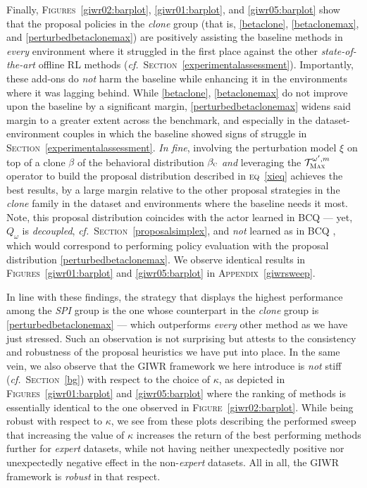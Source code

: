 Finally, \textsc{Figures}~\ref{giwr02:barplot}, \ref{giwr01:barplot}, and \ref{giwr05:barplot}
show that the proposal policies in the \textit{clone} group
(that is, \ref{betaclone}, \ref{betaclonemax}, and \ref{perturbedbetaclonemax})
are positively assisting the baseline methods in \emph{every} environment where it struggled in the first place
against the other \textit{state-of-the-art} offline RL methods
(\textit{cf.}~\textsc{Section}~\ref{experimentalassessment}).
Importantly, these add-ons do \emph{not} harm the baseline while enhancing it in the environments where
it was lagging behind.
While \ref{betaclone}, \ref{betaclonemax} do not improve upon the baseline by a significant margin,
\ref{perturbedbetaclonemax} widens said margin to a greater extent across the benchmark,
and especially in the dataset-environment couples in which the baseline showed signs of struggle in
\textsc{Section}~\ref{experimentalassessment}.
\textit{In fine}, involving the perturbation model $\xi$ on top of a clone $\beta$
of the behavioral distribution $\beta_\textsc{c}$
\emph{and} leveraging the $\mathcal{T}_\textsc{Max}^{\omega', m}$ operator
to build the proposal distribution described in \textsc{eq}~\ref{xieq}
achieves the best results, by a large margin relative
to the other proposal strategies in the \textit{clone} family in the dataset and environments where
the baseline needs it most.
Note, this proposal distribution coincides with the actor learned in BCQ \cite{Fujimoto2018-mj}
--- yet, $Q_\omega$ is \emph{decoupled}, \textit{cf.}~\textsc{Section}~\ref{proposalsimplex},
and \emph{not} learned as in BCQ \cite{Fujimoto2018-mj}, which would correspond to performing
policy evaluation with the proposal distribution \ref{perturbedbetaclonemax}.
We observe identical results in \textsc{Figures}~\ref{giwr01:barplot} and \ref{giwr05:barplot}
in \textsc{Appendix}~\ref{giwrsweep}.

In line with these findings, the strategy that displays the highest performance among the \textit{SPI} group
is the one whose counterpart in the \textit{clone} group is \ref{perturbedbetaclonemax}
--- which outperforms \emph{every} other method as we have just stressed.
Such an observation is not surprising but attests to the consistency and robustness of the proposal
heuristics we have put into place.
In the same vein, we also observe that the GIWR framework we here introduce is \emph{not} stiff
(\textit{cf.}~\textsc{Section}~\ref{bg}) with respect to the choice of $\kappa$, as depicted in
\textsc{Figures}~\ref{giwr01:barplot} and \ref{giwr05:barplot} where the ranking of methods is essentially
identical to the one observed in \textsc{Figure}~\ref{giwr02:barplot}.
While being robust with respect to $\kappa$, we see from these plots describing the performed sweep that
increasing the value of $\kappa$ increases the return of the best performing methods further for
\textit{expert} datasets, while not having neither unexpectedly positive nor unexpectedly negative effect
in the non-\textit{expert} datasets.
All in all, the GIWR framework is \emph{robust} in that respect.

